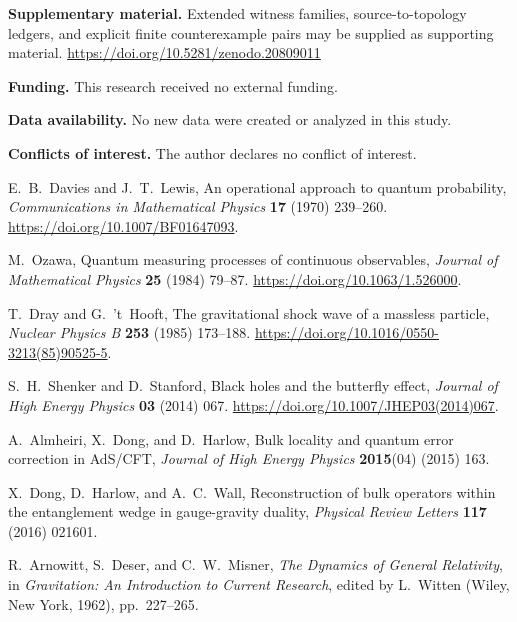 \documentclass[10pt,twoside,a5paper]{article}
\theoremstyle{definition}
\begin{document}
\vspace{4pt}
\noindent\textbf{Supplementary material.} Extended witness families,
source-to-topology ledgers, and explicit finite counterexample pairs may be supplied
as supporting material. 
\url{https://doi.org/10.5281/zenodo.20809011}

\noindent\textbf{Funding.} This research received no external funding.

\noindent\textbf{Data availability.} No new data were created or analyzed in this study.

\noindent\textbf{Conflicts of interest.} The author declares no conflict of interest.

\begin{eref}
E.~B.~Davies and J.~T.~Lewis, An operational approach to quantum probability,
\emph{Communications in Mathematical Physics} \textbf{17} (1970) 239--260.
\url{https://doi.org/10.1007/BF01647093}.

M.~Ozawa, Quantum measuring processes of continuous observables,
\emph{Journal of Mathematical Physics} \textbf{25} (1984) 79--87.
\url{https://doi.org/10.1063/1.526000}.

T.~Dray and G.~'t~Hooft, The gravitational shock wave of a massless particle,
\emph{Nuclear Physics B} \textbf{253} (1985) 173--188.
\url{https://doi.org/10.1016/0550-3213(85)90525-5}.

S.~H.~Shenker and D.~Stanford, Black holes and the butterfly effect,
\emph{Journal of High Energy Physics} \textbf{03} (2014) 067.
\url{https://doi.org/10.1007/JHEP03(2014)067}.

A.~Almheiri, X.~Dong, and D.~Harlow, Bulk locality and quantum error correction in
AdS/CFT, \emph{Journal of High Energy Physics} \textbf{2015}(04) (2015) 163.

X.~Dong, D.~Harlow, and A.~C.~Wall, Reconstruction of bulk operators within the
entanglement wedge in gauge-gravity duality, \emph{Physical Review Letters}
\textbf{117} (2016) 021601.

R.~Arnowitt, S.~Deser, and C.~W.~Misner,
\emph{The Dynamics of General Relativity},
in \emph{Gravitation: An Introduction to Current Research}, edited by L.~Witten
(Wiley, New York, 1962), pp.~227--265.


\end{eref}
\end{document}
